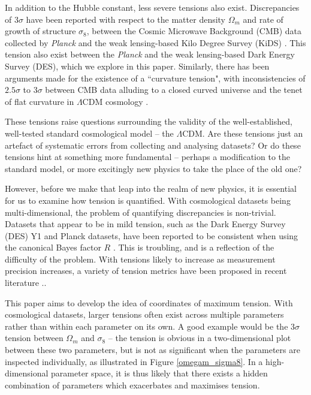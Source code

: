 \documentclass[%
 reprint,
 amsmath,amssymb,
 aps,
]{revtex4-2}
\begin{document}
In addition to the Hubble constant, less severe tensions also exist. Discrepancies of $3\sigma$ have been reported with respect to the matter density $\Omega_m$ and rate of growth of structure $\sigma_8$, between the Cosmic Microwave Background (CMB) data collected by \textit{Planck} and the weak lensing-based Kilo Degree Survey (KiDS) \cite{Heymans2021}. This tension also exist between the \textit{Planck} and the weak lensing-based Dark Energy Survey (DES), which we explore in this paper. Similarly, there has been arguments made for the existence of a ``curvature tension", with inconsistencies of $2.5 \sigma$ to $3 \sigma$ between CMB data alluding to a closed curved universe and the tenet of flat curvature in $\Lambda$CDM cosmology \cite{Handley2021Closed}.

These tensions raise questions surrounding the validity of the well-established, well-tested standard cosmological model -- the $\Lambda$CDM. Are these tensions just an artefact of systematic errors from collecting and analysing datasets? Or do these tensions hint at something more fundamental -- perhaps a modification to the standard model, or more excitingly new physics to take the place of the old one?

However, before we make that leap into the realm of new physics, it is essential for us to examine how tension is quantified. With cosmological datasets being multi-dimensional, the problem of quantifying discrepancies is non-trivial. Datasets that appear to be in mild tension, such as the Dark Energy Survey (DES) Y1 and Planck datasets, have been reported to be consistent when using the canonical Bayes factor $R$ \cite{Handley2019}. This is troubling, and is a reflection of the difficulty of the problem. With tensions likely to increase as measurement precision increases, a variety of tension metrics have been proposed in recent literature \cite{Charnock2017}..

This paper aims to develop the idea of coordinates of maximum tension. With cosmological datasets, larger tensions often exist across multiple parameters rather than within each parameter on its own. A good example would be the $3 \sigma$ tension between $\Omega_m$ and $\sigma_8$ -- the tension is obvious in a two-dimensional plot between these two parameters, but is not as significant when the parameters are inspected individually, as illustrated in Figure \ref{omegam_sigma8}. In a high-dimensional parameter space, it is thus likely that there exists a hidden combination of parameters which exacerbates and maximises tension.
\end{document}
